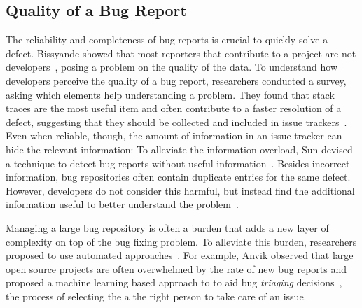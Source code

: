 \subsection{Quality of a Bug Report}

The reliability and completeness of bug reports is crucial to quickly solve a defect. Bissyande \etal showed that most reporters that contribute to a project are not developers~\cite{Biss2013}, posing a problem on the quality of the data. To understand how developers perceive the quality of a bug report, researchers conducted a survey, asking which elements help understanding a problem. They found that stack traces are the most useful item and often contribute to a faster resolution of a defect, suggesting that they should be collected and included in issue trackers~\cite{Zimm2010a,Bett2007,Schr2010}. Even when reliable, though, the amount of information in an issue tracker can hide the relevant information: To alleviate the information overload, Sun devised a technique to detect bug reports without useful information~\cite{Sun2011}. Besides incorrect information, bug repositories often contain duplicate entries for the same defect. However, developers do not consider this harmful, but instead find the additional information useful to better understand the problem~\cite{Bett2008a}.

Managing a large bug repository is often a burden that adds a new layer of complexity on top of the bug fixing problem. To alleviate this burden, researchers proposed to use automated approaches~\cite{Weim2006}. For example, Anvik \etal observed that large open source projects are often overwhelmed by the rate of new bug reports and proposed a machine learning based approach to to aid bug \emph{triaging} decisions~\cite{Anvi2006a}, the process of selecting the a the right person to take care of an issue.



